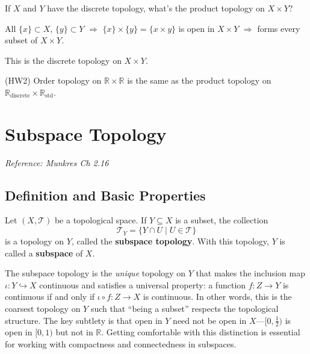 \documentclass[11pt]{report}
\begin{document}
\begin{exbox}
If $X$ and $Y$ have the discrete topology, what's the product topology on $X \times Y$?

All $\{x\} \subset X$, $\{y\} \subset Y$ $\Rightarrow$ $\{x\} \times \{y\} = \{x \times y\}$ is open in $X \times Y$ $\Rightarrow$ forms every subset of $X \times Y$.

This is the discrete topology on $X \times Y$.
\end{exbox}

\begin{exbox}
(HW2) Order topology on $\mathbb{R} \times \mathbb{R}$ is the same as the product topology on $\mathbb{R}_{\text{discrete}} \times \mathbb{R}_{\text{std}}$.
\end{exbox}

\section{Subspace Topology}

\textit{Reference: Munkres Ch 2.16}

\subsection{Definition and Basic Properties}

\begin{defbox}
Let $(X, \mathcal{T})$ be a topological space. If $Y \subseteq X$ is a subset, the collection 
\[\mathcal{T}_Y = \{Y \cap U \mid U \in \mathcal{T}\}\]
is a topology on $Y$, called the \textbf{subspace topology}. With this topology, $Y$ is called a \textbf{subspace} of $X$.
\end{defbox}

\begin{rembox}
The subspace topology is the \emph{unique} topology on $Y$ that makes the inclusion map $\iota: Y \hookrightarrow X$ continuous and satisfies a universal property: a function $f: Z \to Y$ is continuous if and only if $\iota \circ f: Z \to X$ is continuous. In other words, this is the coarsest topology on $Y$ such that ``being a subset'' respects the topological structure. The key subtlety is that open in $Y$ need not be open in $X$---$[0, \tfrac{1}{2})$ is open in $[0,1)$ but not in $\mathbb{R}$. Getting comfortable with this distinction is essential for working with compactness and connectedness in subspaces.
\end{rembox}
\end{document}
